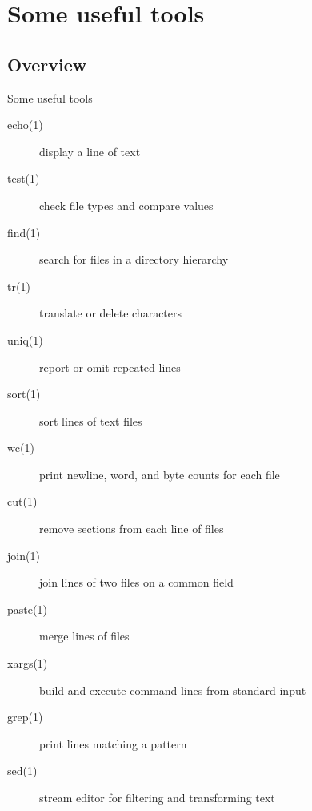 \documentclass[handout]{beamer}
\begin{document}
\section{Some useful tools}

\subsection{Overview}

\begin{frame}{Some useful tools}
	\begin{description}
		\item[echo(1)] display a line of text
		\item[test(1)] check file types and compare values
		\item[find(1)] search for files in a directory hierarchy
		\item[tr(1)] translate or delete characters
		\item[uniq(1)] report or omit repeated lines
		\item[sort(1)] sort lines of text files
		\item[wc(1)] print newline, word, and byte counts for each file
		\item[cut(1)] remove sections from each line of files
		\item[join(1)] join lines of two files on a common field
		\item[paste(1)] merge lines of files
		\item[xargs(1)] build and execute command lines from standard input
		\item[grep(1)] print lines matching a pattern
		\item[sed(1)] stream editor for filtering and transforming text
	\end{description}
\end{frame}
\end{document}
